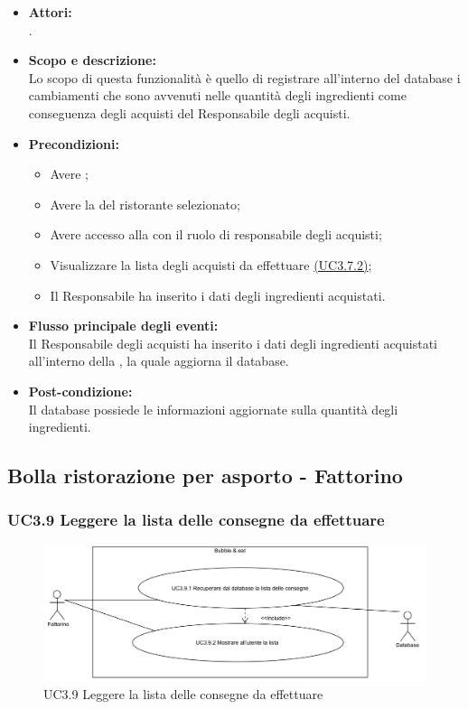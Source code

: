 \begin{itemize}
	\item \textbf{Attori:}
	\\.
	\item \textbf{Scopo e descrizione:} 
	\\Lo scopo di questa funzionalità è quello di registrare all'interno del database i cambiamenti che sono avvenuti nelle quantità degli ingredienti come conseguenza degli acquisti del Responsabile degli acquisti.
	\item \textbf{Precondizioni:}
	\begin{itemize}
		\item Avere ;
		\item Avere la  del ristorante selezionato;
		\item Avere accesso alla  con il ruolo di responsabile degli acquisti;
		\item Visualizzare la lista degli acquisti da effettuare \hyperref[UC3.7.2]{(UC3.7.2)};
		\item Il Responsabile ha inserito i dati degli ingredienti acquistati.
	\end{itemize}
	\item \textbf{Flusso principale degli eventi:}
	\\Il Responsabile degli acquisti ha inserito i dati degli ingredienti acquistati all'interno della , la quale aggiorna il database.
	\item \textbf{Post-condizione:}
	\\Il database possiede le informazioni aggiornate sulla quantità degli ingredienti.
\end{itemize}

\subsection{Bolla ristorazione per asporto - Fattorino}

\subsubsection{UC3.9 Leggere la lista delle consegne da effettuare} \label{UC3.9}

\begin{figure}[H]
	\centering
	\includegraphics[width=15cm]{../../documenti/AnalisiDeiRequisiti/Diagrammi_img/uc3_9.png}
	\caption{UC3.9 Leggere la lista delle consegne da effettuare}
\end{figure}

